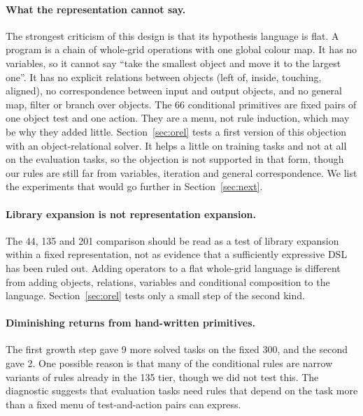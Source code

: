 \documentclass[sigconf,nonacm]{acmart}
\begin{document}
\paragraph{What the representation cannot say.}\label{sec:disc} The strongest criticism of this design is that its hypothesis language is flat. A program is a chain of whole-grid operations with one global colour map. It has no variables, so it cannot say ``take the smallest object and move it to the largest one''. It has no explicit relations between objects (left of, inside, touching, aligned), no correspondence between input and output objects, and no general map, filter or branch over objects. The 66 conditional primitives are fixed pairs of one object test and one action. They are a menu, not rule induction, which may be why they added little. Section~\ref{sec:orel} tests a first version of this objection with an object-relational solver. It helps a little on training tasks and not at all on the evaluation tasks, so the objection is not supported in that form, though our rules are still far from variables, iteration and general correspondence. We list the experiments that would go further in Section~\ref{sec:next}.

\paragraph{Library expansion is not representation expansion.} The 44, 135 and 201 comparison should be read as a test of library expansion within a fixed representation, not as evidence that a sufficiently expressive DSL has been ruled out. Adding operators to a flat whole-grid language is different from adding objects, relations, variables and conditional composition to the language. Section~\ref{sec:orel} tests only a small step of the second kind.

\paragraph{Diminishing returns from hand-written primitives.} The first growth step gave 9 more solved tasks on the fixed 300, and the second gave 2. One possible reason is that many of the conditional rules are narrow variants of rules already in the 135 tier, though we did not test this. The diagnostic suggests that evaluation tasks need rules that depend on the task more than a fixed menu of test-and-action pairs can express.
\end{document}
